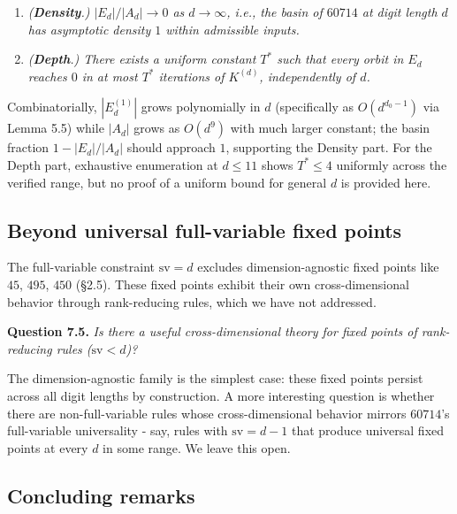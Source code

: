 \documentclass[11pt,letterpaper]{article}
\providecommand{\tightlist}{%
  \setlength{\itemsep}{0pt}\setlength{\parskip}{0pt}}
\theoremstyle{paperstyle}
\theoremstyle{paperstyledef}
\theoremstyle{paperstylerem}
\begin{document}
\begin{enumerate}
\def\labelenumi{\arabic{enumi}.}
\tightlist
\item
  \emph{(\textbf{Density}.) \(|E_d| / |A_d| \to 0\) as \(d \to \infty\),
  i.e., the basin of \(60714\) at digit length \(d\) has asymptotic
  density \(1\) within admissible inputs.}
\item
  \emph{(\textbf{Depth}.) There exists a uniform constant \(T^*\) such
  that every orbit in \(E_d\) reaches \(0\) in at most \(T^*\)
  iterations of \(K^{(d)}\), independently of \(d\).}
\end{enumerate}

Combinatorially, \(|E_d^{(1)}|\) grows polynomially in \(d\)
(specifically as \(O(d^{d_0 - 1})\) via Lemma 5.5) while \(|A_d|\) grows
as \(O(d^9)\) with much larger constant; the basin fraction
\(1 - |E_d|/|A_d|\) should approach \(1\), supporting the Density part.
For the Depth part, exhaustive enumeration at \(d \leq 11\) shows
\(T^* \leq 4\) uniformly across the verified range, but no proof of a
uniform bound for general \(d\) is provided here.

\hypertarget{beyond-universal-full-variable-fixed-points}{%
\subsection{Beyond universal full-variable fixed points}\label{beyond-universal-full-variable-fixed-points}}

The full-variable constraint \(\mathrm{sv} = d\) excludes
dimension-agnostic fixed points like \(45\), \(495\), \(450\) (§2.5).
These fixed points exhibit their own cross-dimensional behavior through
rank-reducing rules, which we have not addressed.

\textbf{Question 7.5.} \emph{Is there a useful cross-dimensional theory
for fixed points of rank-reducing rules (\(\mathrm{sv} < d\))?}

The dimension-agnostic family is the simplest case: these fixed points
persist across all digit lengths by construction. A more interesting
question is whether there are non-full-variable rules whose
cross-dimensional behavior mirrors \(60714\)'s full-variable
universality - say, rules with \(\mathrm{sv} = d - 1\) that produce
universal fixed points at every \(d\) in some range. We leave this open.

\hypertarget{concluding-remarks}{%
\subsection{Concluding remarks}\label{concluding-remarks}}
\end{document}
